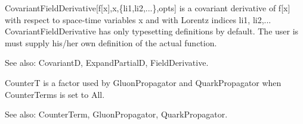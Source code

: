 

CovariantFieldDerivative[f[x],x,\{li1,li2,...\},opts] is a covariant derivative of f[x] with respect to space-time variables x and with
  Lorentz indices li1, li2,... CovariantFieldDerivative has only typesetting definitions by default. The user is must supply his/her own
  definition of the actual function.

See also:  CovariantD, ExpandPartialD, FieldDerivative.






CounterT is a factor used by GluonPropagator and QuarkPropagator when CounterTerms is set to All.

See also:  CounterTerm, GluonPropagator, QuarkPropagator.




